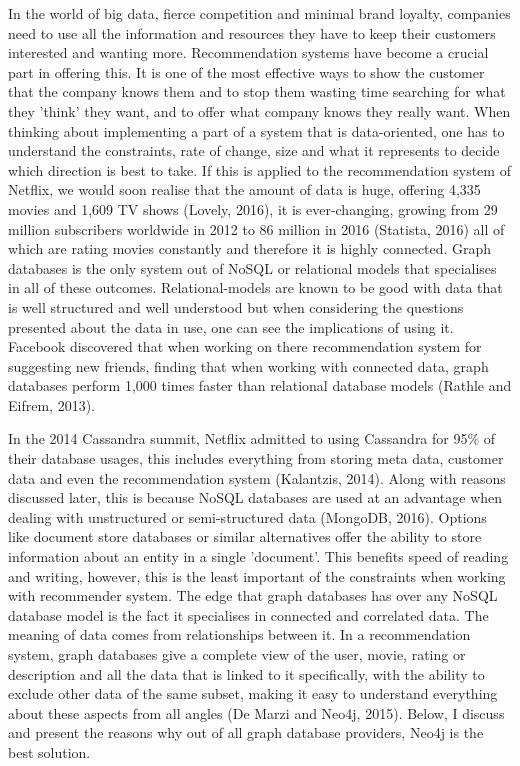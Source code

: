 \documentclass[a4paper]{article}
\begin{document}
\justify


In the world of big data, fierce competition and minimal brand loyalty, companies need to use all the information and resources they have to keep their customers interested and wanting more. Recommendation systems have become a crucial part in offering this. It is one of the most effective ways to show the customer that the company knows them and to stop them wasting time searching for what they 'think' they want, and to offer what company knows they really want. When thinking about implementing a part of a system that is data-oriented, one has to understand the constraints, rate of change, size and what it represents to decide which direction is best to take. If this is applied to the recommendation system of Netflix, we would soon realise that the amount of data is huge, offering 4,335 movies and 1,609 TV shows (Lovely, 2016), it is ever-changing, growing from 29 million subscribers worldwide in 2012 to 86 million in 2016 (Statista, 2016) all of which are rating movies constantly and therefore it is highly connected. Graph databases is the only system out of NoSQL or relational models that specialises in all of these outcomes. Relational-models are known to be good with data that is well structured and well understood but when considering the questions presented about the data in use, one can see the implications of using it. Facebook discovered that when working on there recommendation system for suggesting new friends, finding that when working with connected data, graph databases perform 1,000 times faster than relational database models (Rathle and Eifrem, 2013).

In the 2014 Cassandra summit, Netflix admitted to using Cassandra for 95\% of their database usages, this includes everything from storing meta data, customer data and even the recommendation system (Kalantzis, 2014). Along with reasons discussed later, this is because NoSQL databases are used at an advantage when dealing with unstructured or semi-structured data (MongoDB, 2016). Options like document store databases or similar alternatives offer the ability to store information about an entity in a single 'document'. This benefits speed of reading and writing, however, this is the least important of the constraints when working with recommender system. The edge that graph databases has over any NoSQL database model is the fact it specialises in connected and correlated data. The meaning of data comes from relationships between it. In a recommendation system, graph databases give a complete view of the user, movie, rating or description and all the data that is linked to it specifically, with the ability to exclude other data of the same subset, making it easy to understand everything about these aspects from all angles (De Marzi and Neo4j, 2015). Below, I discuss and present the reasons why out of all graph database providers, Neo4j is the best solution. \par
\end{document}
